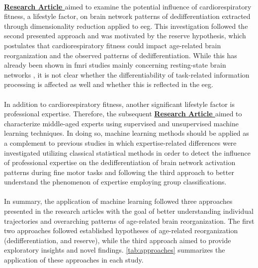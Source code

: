 \\
\textbf{\hyperref[pub:paperIII]{Research Article }} aimed to examine the potential influence of cardiorespiratory fitness, a lifestyle factor, on brain network patterns of dedifferentiation extracted through dimensionality reduction applied to \gls{eeg}. This investigation followed the second presented approach and was motivated by the reserve hypothesis, which postulates that cardiorespiratory fitness could impact age-related brain reorganization and the observed patterns of dedifferentiation. While this has already been shown in \gls{fmri} studies mainly concerning resting-state brain networks \cite{Stillman2019}, it is not clear whether the differentiability of task-related information processing is affected as well and whether this is reflected in the \gls{eeg}.\\
\\
In addition to cardiorespiratory fitness, another significant lifestyle factor is professional expertise. Therefore, the subsequent \textbf{\hyperref[pub:paperIV]{Research Article }} aimed to characterize middle-aged experts using supervised and unsupervised machine learning techniques. In doing so, machine learning methods should be applied as a complement to previous studies in which expertise-related differences were investigated utilizing classical statistical methods \cite{Vieluf2018, Goelz2018} in order to detect the influence of professional expertise on the dedifferentiation of brain network activation patterns during fine motor tasks and following the third approach to better understand the phenomenon of expertise employing group classifications.\\
\\
In summary, the application of machine learning followed three approaches presented in the research articles with the goal of better understanding individual trajectories and overarching patterns of age-related brain reorganization. The first two approaches followed established hypotheses of age-related reorganization (dedifferentiation, and reserve), while the third approach aimed to provide exploratory insights and novel findings. \autoref{tab:approaches} summarizes the application of these approaches in each study.


